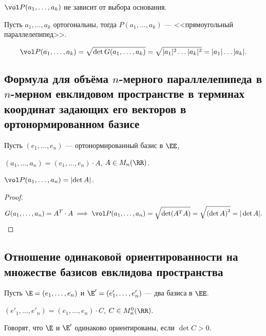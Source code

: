\begin{corollary}
    $\vol P(a_1, \dots, a_k)$ не зависит от выбора основания.
\end{corollary}

\begin{example}
    Пусть $a_1, \dots, a_k$ ортогональны, тогда $P(a_1, \dots, a_k)$ --- <<прямоугольный параллелепипед>>.

    \begin{equation*}
        \vol P(a_1, \dots, a_k) = \sqrt{\det G(a_1, \dots, a_k)} = \sqrt{|a_1|^2 \dots |a_k|^2} = |a_1| \dots |a_k|
    .\end{equation*}
\end{example}


\subsection{Формула для объёма $n$-мерного параллелепипеда в $n$-мерном евклидовом пространстве в терминах координат задающих его векторов в ортонормированном базисе}

Пусть $(e_1, \dots, e_n)$ --- ортонормированный базис в $\EE$,

$(a_1, \dots, a_n) = (e_1, \dots, e_n) \cdot A$, $A \in M_n(\RR)$.

\begin{proposal}
    $\vol P(a_1, \dots, a_n) = \left|\det A\right|$.
\end{proposal}

\begin{proof}
    \begin{equation*}
        G(a_1, \dots, a_n) = A^{T} \cdot A \implies \vol P(a_1, \dots, a_n) = \sqrt{\det (A^{T} A)} = \sqrt{\left(\det A\right)^2} = |\det A|
        \qedhere
    .\end{equation*}
\end{proof}


\subsection{Отношение одинаковой ориентированности на множестве базисов евклидова пространства}

Пусть $\E = (e_1, \dots, e_n)$ и $\E' = (e'_1, \dots, e'_n)$ --- два базиса в $\EE$.

$(e'_1, \dots, e'_n) = (e_1, \dots, e_n) \cdot C$, $C \in M_n^0(\RR)$.

\begin{definition}
    Говорят, что $\E$ и $\E'$ одинаково ориентированы, если $\det C > 0$.
\end{definition}

